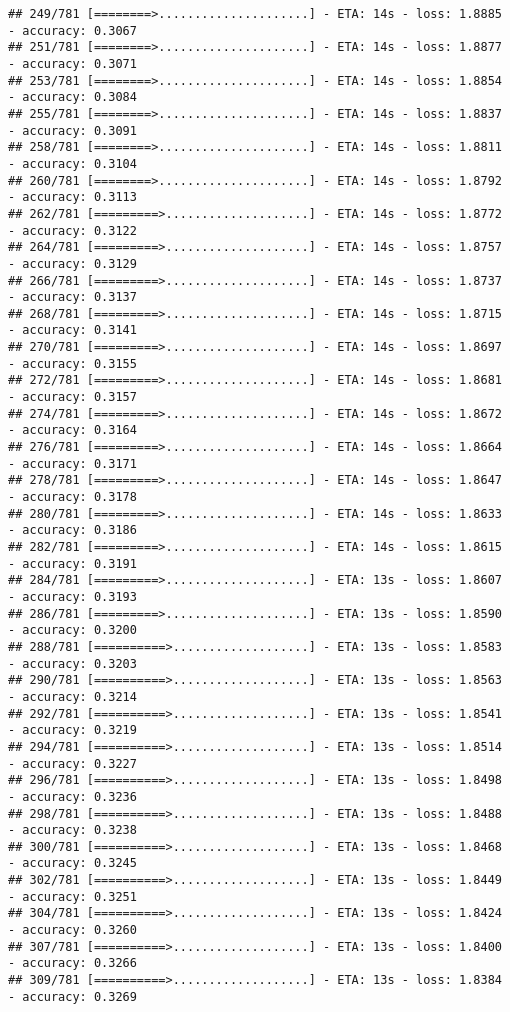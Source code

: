 \documentclass[
]{article}
\begin{document}
\begin{verbatim}
## 249/781 [========>.....................] - ETA: 14s - loss: 1.8885 - accuracy: 0.3067
## 251/781 [========>.....................] - ETA: 14s - loss: 1.8877 - accuracy: 0.3071
## 253/781 [========>.....................] - ETA: 14s - loss: 1.8854 - accuracy: 0.3084
## 255/781 [========>.....................] - ETA: 14s - loss: 1.8837 - accuracy: 0.3091
## 258/781 [========>.....................] - ETA: 14s - loss: 1.8811 - accuracy: 0.3104
## 260/781 [========>.....................] - ETA: 14s - loss: 1.8792 - accuracy: 0.3113
## 262/781 [=========>....................] - ETA: 14s - loss: 1.8772 - accuracy: 0.3122
## 264/781 [=========>....................] - ETA: 14s - loss: 1.8757 - accuracy: 0.3129
## 266/781 [=========>....................] - ETA: 14s - loss: 1.8737 - accuracy: 0.3137
## 268/781 [=========>....................] - ETA: 14s - loss: 1.8715 - accuracy: 0.3141
## 270/781 [=========>....................] - ETA: 14s - loss: 1.8697 - accuracy: 0.3155
## 272/781 [=========>....................] - ETA: 14s - loss: 1.8681 - accuracy: 0.3157
## 274/781 [=========>....................] - ETA: 14s - loss: 1.8672 - accuracy: 0.3164
## 276/781 [=========>....................] - ETA: 14s - loss: 1.8664 - accuracy: 0.3171
## 278/781 [=========>....................] - ETA: 14s - loss: 1.8647 - accuracy: 0.3178
## 280/781 [=========>....................] - ETA: 14s - loss: 1.8633 - accuracy: 0.3186
## 282/781 [=========>....................] - ETA: 14s - loss: 1.8615 - accuracy: 0.3191
## 284/781 [=========>....................] - ETA: 13s - loss: 1.8607 - accuracy: 0.3193
## 286/781 [=========>....................] - ETA: 13s - loss: 1.8590 - accuracy: 0.3200
## 288/781 [==========>...................] - ETA: 13s - loss: 1.8583 - accuracy: 0.3203
## 290/781 [==========>...................] - ETA: 13s - loss: 1.8563 - accuracy: 0.3214
## 292/781 [==========>...................] - ETA: 13s - loss: 1.8541 - accuracy: 0.3219
## 294/781 [==========>...................] - ETA: 13s - loss: 1.8514 - accuracy: 0.3227
## 296/781 [==========>...................] - ETA: 13s - loss: 1.8498 - accuracy: 0.3236
## 298/781 [==========>...................] - ETA: 13s - loss: 1.8488 - accuracy: 0.3238
## 300/781 [==========>...................] - ETA: 13s - loss: 1.8468 - accuracy: 0.3245
## 302/781 [==========>...................] - ETA: 13s - loss: 1.8449 - accuracy: 0.3251
## 304/781 [==========>...................] - ETA: 13s - loss: 1.8424 - accuracy: 0.3260
## 307/781 [==========>...................] - ETA: 13s - loss: 1.8400 - accuracy: 0.3266
## 309/781 [==========>...................] - ETA: 13s - loss: 1.8384 - accuracy: 0.3269

\end{verbatim}
\end{document}
